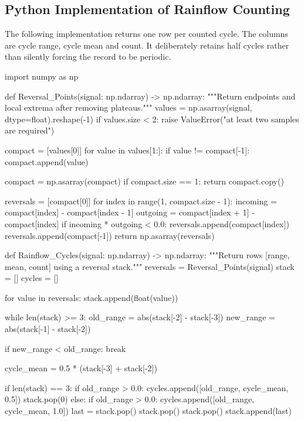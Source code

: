 \subsection{Python Implementation of Rainflow Counting}

The following implementation returns one row per counted cycle. The columns are
cycle range, cycle mean and count. It deliberately retains half cycles rather
than silently forcing the record to be periodic.

\begin{python}
import numpy as np


def Reversal_Points(signal: np.ndarray) -> np.ndarray:
    """Return endpoints and local extrema after removing plateaus."""
    values = np.asarray(signal, dtype=float).reshape(-1)
    if values.size < 2:
        raise ValueError("at least two samples are required")

    compact = [values[0]]
    for value in values[1:]:
        if value != compact[-1]:
            compact.append(value)

    compact = np.asarray(compact)
    if compact.size == 1:
        return compact.copy()

    reversals = [compact[0]]
    for index in range(1, compact.size - 1):
        incoming = compact[index] - compact[index - 1]
        outgoing = compact[index + 1] - compact[index]
        if incoming * outgoing < 0.0:
            reversals.append(compact[index])
    reversals.append(compact[-1])
    return np.asarray(reversals)


def Rainflow_Cycles(signal: np.ndarray) -> np.ndarray:
    """Return rows [range, mean, count] using a reversal stack."""
    reversals = Reversal_Points(signal)
    stack = []
    cycles = []

    for value in reversals:
        stack.append(float(value))

        while len(stack) >= 3:
            old_range = abs(stack[-2] - stack[-3])
            new_range = abs(stack[-1] - stack[-2])

            if new_range < old_range:
                break

            cycle_mean = 0.5 * (stack[-3] + stack[-2])

            if len(stack) == 3:
                if old_range > 0.0:
                    cycles.append([old_range, cycle_mean, 0.5])
                stack.pop(0)
            else:
                if old_range > 0.0:
                    cycles.append([old_range, cycle_mean, 1.0])
                last = stack.pop()
                stack.pop()
                stack.pop()
                stack.append(last)


\end{python}
